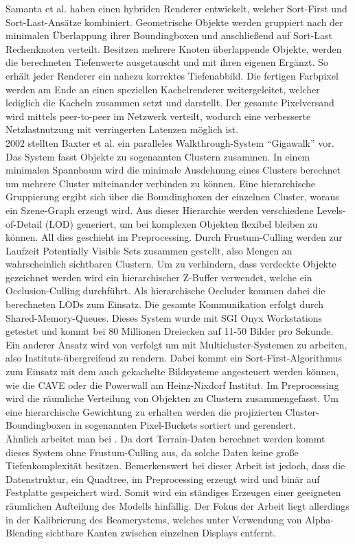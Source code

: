 Samanta et al. \cite{samanta} haben einen hybriden Renderer entwickelt, welcher Sort-First und Sort-Last-Ansätze kombiniert. Geometrische Objekte werden gruppiert nach der minimalen Überlappung ihrer Boundingboxen und anschließend auf Sort-Last Rechenknoten verteilt. Besitzen mehrere Knoten überlappende Objekte, werden die berechneten Tiefenwerte ausgetauscht und mit ihren eigenen Ergänzt. So erhält jeder Renderer ein nahezu korrektes Tiefenabbild. Die fertigen Farbpixel werden am Ende an einen speziellen Kachelrenderer weitergeleitet, welcher lediglich die Kacheln zusammen setzt und darstellt. Der gesamte Pixelversand wird mittels peer-to-peer im Netz\-werk verteilt, wodurch eine verbesserte Netzlastnutzung mit verringerten Latenzen möglich ist.\\
2002 stellten Baxter et al. \cite{baxter} ein paralleles Walkthrough-System "`Gigawalk"' vor. Das System fasst Objekte zu sogenannten Clustern zusammen. In einem minimalen Spannbaum wird die minimale Ausdehnung eines Clusters berechnet um mehrere Cluster miteinander verbinden zu können. Eine hierarchische Gruppierung ergibt sich über die Boundingboxen der einzelnen Cluster, woraus ein Szene-Graph erzeugt wird. Aus dieser Hierarchie werden verschiedene Levels-of-Detail (LOD)\cite{hlod} generiert, um bei komplexen Objekten flexibel bleiben zu können. All dies geschieht im Preprocessing. Durch Frustum-Culling werden zur Laufzeit Potentially Visible Sets \cite{RTR3} zusammen gestellt, also Mengen an wahrscheinlich sichtbaren Clustern. Um zu verhindern, dass verdeckte Objekte gezeichnet werden wird ein hierarchischer Z-Buffer verwendet, welche ein Occlusion-Culling durchführt. Als hierarchische Occluder kommen dabei die berechneten LODs zum Einsatz. Die gesamte Kommunikation erfolgt durch Shared-Memory-Queues. Dieses System wurde mit SGI Onyx Workstations getestet und kommt bei 80 Millionen Dreiecken auf 11-50 Bilder pro Sekunde.\\
Ein anderer Ansatz wird von \cite{dpbp} verfolgt um mit Multicluster-Systemen zu arbeiten, also Instituts-übergreifend zu rendern. Dabei kommt ein Sort-First-Algorithmus zum Einsatz mit dem auch gekachelte Bildsysteme angesteuert werden können, wie die CAVE \cite{cave} oder die Powerwall am Heinz-Nixdorf Institut. Im Preprocessing wird die räumliche Verteilung von Objekten zu Clustern zusammengefasst. Um eine hierarchische Gewichtung zu erhalten werden die projizierten Cluster-Boundingboxen in sogenannten Pixel-Buckets sortiert und gerendert.\\
Ähnlich arbeitet man bei \cite{DBLP:journals/ijvr/YinJSZ06}. Da dort Terrain-Daten berechnet werden kommt dieses System ohne Frustum-Culling aus, da solche Daten keine große Tiefenkomplexität besitzen. Bemerkenswert bei dieser Arbeit ist jedoch, dass die Datenstruktur, ein Quadtree, im Preprocessing erzeugt wird und binär auf Festplatte gespeichert wird. Somit wird ein ständiges Erzeugen einer geeigneten räumlichen Aufteilung des Modells hinfällig. Der Fokus der Arbeit liegt allerdings in der Kalibrierung des Beamerystems, welches unter Verwendung von Alpha-Blending sichtbare Kanten zwischen einzelnen Displays entfernt.\\

